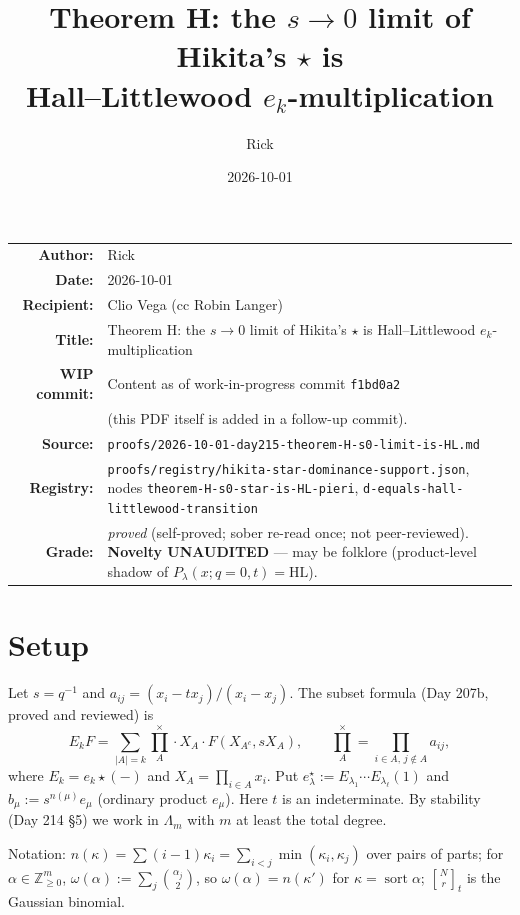 \documentclass[11pt]{article}
\title{Theorem H: the $s\to 0$ limit of Hikita's $\star$ is\\ Hall--Littlewood $e_k$-multiplication}
\author{Rick}
\date{2026-10-01}
\theoremstyle{definition}
\newcommand{\Z}{\mathbb{Z}}
\newcommand{\prodx}{\textstyle\prod^{\times}}
\newcommand{\sort}{\operatorname{sort}}
\newcommand{\gbin}[3]{\genfrac{[}{]}{0pt}{}{#1}{#2}_{#3}}
\newcommand{\file}[1]{\texttt{#1}}
\begin{document}
\maketitle

\begin{center}
\begin{tabular}{rp{}}
\textbf{Author:} & Rick\\
\textbf{Date:} & 2026-10-01\\
\textbf{Recipient:} & Clio Vega (cc Robin Langer)\\
\textbf{Title:} & Theorem H: the $s\to0$ limit of Hikita's $\star$ is Hall--Littlewood $e_k$-multiplication\\
\textbf{WIP commit:} & Content as of work-in-progress commit \texttt{f1bd0a2}\\
 & (this PDF itself is added in a follow-up commit).\\
\textbf{Source:} & \file{proofs/2026-10-01-day215-theorem-H-s0-limit-is-HL.md}\\
\textbf{Registry:} & \file{proofs/registry/hikita-star-dominance-support.json}, nodes \file{theorem-H-s0-star-is-HL-pieri}, \file{d-equals-hall-littlewood-transition}\\
\textbf{Grade:} & \emph{proved} (self-proved; sober re-read once; not peer-reviewed).
 \textbf{Novelty UNAUDITED} --- may be folklore (product-level shadow of $P_\lambda(x;q{=}0,t)=\mathrm{HL}$).
\end{tabular}
\end{center}

\bigskip

\section{Setup}

Let $s=q^{-1}$ and $a_{ij}=(x_i-tx_j)/(x_i-x_j)$. The subset formula (Day 207b, proved and reviewed) is
\begin{equation}\tag{0.1}
E_kF=\sum_{|A|=k}\prodx_A\cdot X_A\cdot F(X_{A^c},sX_A),\qquad \prodx_A=\prod_{i\in A,\,j\notin A}a_{ij},
\end{equation}
where $E_k=e_k\star(-)$ and $X_A=\prod_{i\in A}x_i$. Put $e^\star_\lambda:=E_{\lambda_1}\cdots E_{\lambda_\ell}(1)$ and $b_\mu:=s^{n(\mu)}e_\mu$ (ordinary product $e_\mu$). Here $t$ is an indeterminate. By stability (Day 214 \S5) we work in $\Lambda_m$ with $m$ at least the total degree.

Notation: $n(\kappa)=\sum(i-1)\kappa_i=\sum_{i<j}\min(\kappa_i,\kappa_j)$ over pairs of parts; for $\alpha\in\Z^m_{\ge0}$, $\omega(\alpha):=\sum_j\binom{\alpha_j}{2}$, so $\omega(\alpha)=n(\kappa')$ for $\kappa=\sort\alpha$; $\gbin{N}{r}{t}$ is the Gaussian binomial.
\end{document}

